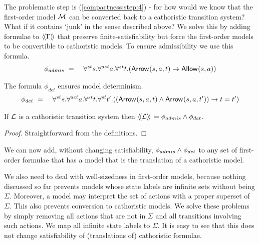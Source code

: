 \NI The problematic step is (\ref{compactness:step:4}) - for how would
we know that the first-order model $\mathcal{M}$ can be converted back to
a cathoristic transition system? What if it contains `junk' in the
sense described above?  
We solve this by adding formulae to 
$\langle\!\langle \Gamma \rangle\!\rangle$ that preserve finite-satisfiability but force the
first-order models to be convertible to cathoristic models.
 To ensure admissibility we use this formula.
\begin{eqnarray*}
   \phi_{admis} 
      & \ =\ &
   \forall^{st} s.\forall^{act} a.\forall^{st} t.( \mathsf{Arrow}^{}(s, a, t) \rightarrow \mathsf{Allow}^{}(s, a)) 
\end{eqnarray*}

\NI The formula $\phi_{det}$ ensures model determinism.
\begin{eqnarray*}
   \phi_{det} 
      & \ =\ &
   \forall^{st} s.\forall^{act} a.\forall^{st} t.\forall^{st} t'.
   ((\mathsf{Arrow}^{}(s, a, t)  \land \mathsf{Arrow}^{}(s, a, t') ) \rightarrow t = t' )   
\end{eqnarray*}

\begin{lemma}\label{compactness:lemma:23399}
If $\mathcal{L}$ is a cathoristic transition system then $\langle\!\langle \mathcal{L} \rangle\!\rangle \models
\phi_{admis} \land \phi_{det}$.
\end{lemma}

\begin{proof}
Straightforward from the definitions.
\end{proof}

We can now add, without changing satisfiability, $\phi_{admis}
\land \phi_{det}$ to any set of first-order formulae that has a model
that is the translation of a cathoristic model.

We also need to deal with well-sizedness in first-order models,
because nothing discussed so far prevents models whose state labels are
infinite sets without being $\Sigma$.  Moreover, a model may interpret
the set of actions with a proper superset of $\Sigma$.  This also
prevents conversion to cathoristic models. We solve these problems by
simply removing all actions that are not in $\Sigma$ and all
transitions involving such actions.  We map all
infinite state labels to $\Sigma$. It is easy to see that this does not
change satisfiability of (translations of) cathoristic formulae.


